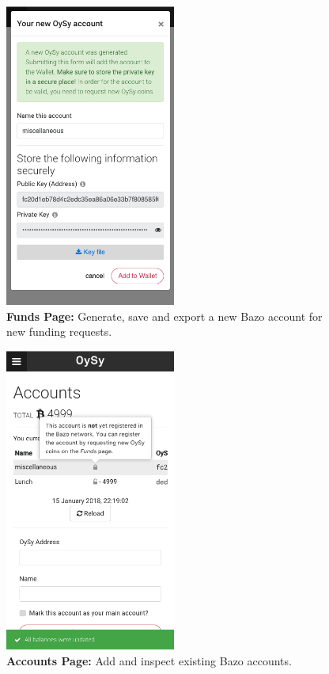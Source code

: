 \begin{figure}
\centering
\includegraphics[width=0.5\textwidth]{screenshots/Funds-2.png}
\caption{\label{fig:uifunds2}\textbf{Funds Page:} Generate, save and export a new Bazo account for new funding requests.}
\end{figure}

\begin{figure}
\centering
\includegraphics[width=0.5\textwidth]{screenshots/Accounts.png}
\caption{\label{fig:uiaccounts1}\textbf{Accounts Page:} Add and inspect existing Bazo accounts.}
\end{figure}

